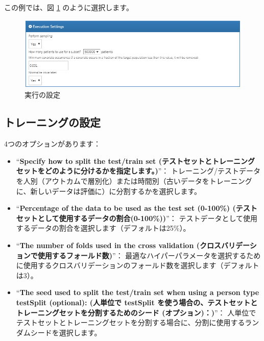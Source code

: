 \documentclass[
  11pt]{book}
\theoremstyle{definition}
\theoremstyle{definition}
\theoremstyle{definition}
\theoremstyle{definition}
\theoremstyle{remark}
\begin{document}
この例では、図 \ref{fig:executionSettings} のように選択します。

\begin{figure}

{\centering \includegraphics[width=1\linewidth]{images/PatientLevelPrediction/executionSettings} 

}

\caption{実行の設定}\label{fig:executionSettings}
\end{figure}

\subsection{トレーニングの設定}\label{ux30c8ux30ecux30fcux30cbux30f3ux30b0ux306eux8a2dux5b9a}

4つのオプションがあります：

\begin{itemize}
\item
  ``\textbf{Specify how to split the test/train set (テストセットとトレーニングセットをどのように分けるかを指定します。)}''： トレーニング/テストデータを人別（アウトカムで層別化）または時間別（古いデータをトレーニングに、新しいデータは評価に）に分割するかを選択します。
\item
  ``\textbf{Percentage of the data to be used as the test set (0-100\%) (テストセットとして使用するデータの割合(0-100\%))}''： テストデータとして使用するデータの割合を選択します（デフォルトは25\%）。
\item
  ``\textbf{The number of folds used in the cross validation (クロスバリデーションで使用するフォールド数)}''： 最適なハイパーパラメータを選択するために使用するクロスバリデーションのフォールド数を選択します（デフォルトは3）。
\item
  ``\textbf{The seed used to split the test/train set when using a person type testSplit (optional): (人単位で testSplit を使う場合の、テストセットとトレーニングセットを分割するためのシード (オプション)：)}''： 人単位でテストセットとトレーニングセットを分割する場合に、分割に使用するランダムシードを選択します。
\end{itemize}
\end{document}
